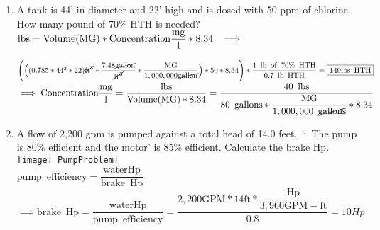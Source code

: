 \documentclass{article}
\begin{document}
\begin{enumerate}
\item A tank is 44' in diameter and 22' high and is dosed with 50 ppm of chlorine. How many pound of 70\% HTH is needed?\\
$\mathrm{lbs}=\mathrm{Volume}{\mathrm{(MG)}}* \mathrm{Concentration}\dfrac{\mathrm{mg}}{\mathrm{l}}*8.34 \hspace{0.2cm} \implies $\\
\vspace{0.2cm}

$\Bigg(\Big( (0.785*44^2*22)\cancel{\mathrm{ft}^3}*\dfrac{7.48\cancel{\mathrm{gallon}}}{\cancel{\mathrm{ft}^3}}*\dfrac{\mathrm{MG}}{1,000,000\cancel{\mathrm{gallon}}}\Big)*50*8.34 \Bigg)*\dfrac{1 \enspace \mathrm{lb \enspace of \enspace 70\% \enspace HTH}}{0.7 \enspace \mathrm{lb \enspace HTH}}  =\boxed{149 \mathrm{lbs \enspace HTH}}$\\
\vspace{0.2cm}
$ \implies \mathrm{Concentration}\dfrac{\mathrm{mg}}{\mathrm{l}}=\dfrac{ \mathrm{lbs}}{\mathrm{Volume}\mathrm{(MG)}*8.34}=\dfrac{40 \enspace \mathrm{lbs}}{80 \enspace\mathrm{gallons}*\dfrac{\mathrm{MG}}{1,000,000 \enspace \cancel{\mathrm{gallons}}}*8.34}$
\vspace{0.2cm}


\item A flow of 2,200 gpm  is pumped against a total head of 14.0 feet. · The pump is 80\% efficient and the motor' is 85\% efficient. Calculate the brake Hp.\\


\vspace{0.4cm}\texttt{[image: PumpProblem]}\\
\vspace{0.3cm}
$\mathrm{pump \enspace efficiency}=\dfrac{\mathrm{water Hp}}{\mathrm{brake \enspace Hp}}$\\
$\implies \mathrm{brake \enspace Hp}=\dfrac{\mathrm{water Hp}}{\mathrm{pump \enspace efficiency}}=\dfrac{2,200\mathrm{GPM}*14\mathrm{ft}*\dfrac{\mathrm{Hp}}{3,960 \mathrm{GPM-ft}}}{0.8}=\boxed{10Hp}$
\end{enumerate}
\end{document}
